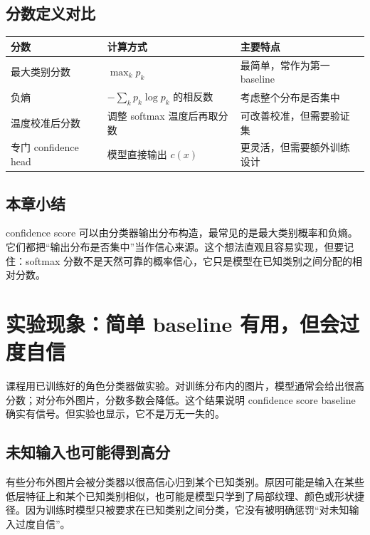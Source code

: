 \documentclass[a4paper]{article}
\begin{document}
\subsection{分数定义对比}

\begin{center}
\begin{tabular}{L{3.0cm} L{4.4cm} L{5.0cm}}
\toprule
分数 & 计算方式 & 主要特点 \\
\midrule
最大类别分数 & $\max_k p_k$ & 最简单，常作为第一 baseline \\
负熵 & $-\sum_k p_k\log p_k$ 的相反数 & 考虑整个分布是否集中 \\
温度校准后分数 & 调整 softmax 温度后再取分数 & 可改善校准，但需要验证集 \\
专门 confidence head & 模型直接输出 $c(x)$ & 更灵活，但需要额外训练设计 \\
\bottomrule
\end{tabular}
\end{center}

\subsection{本章小结}

confidence score 可以由分类器输出分布构造，最常见的是最大类别概率和负熵。它们都把“输出分布是否集中”当作信心来源。这个想法直观且容易实现，但要记住：softmax 分数不是天然可靠的概率信心，它只是模型在已知类别之间分配的相对分数。

\section{实验现象：简单 baseline 有用，但会过度自信}

课程用已训练好的角色分类器做实验。对训练分布内的图片，模型通常会给出很高分数；对分布外图片，分数多数会降低。这个结果说明 confidence score baseline 确实有信号。但实验也显示，它不是万无一失的。

\subsection{未知输入也可能得到高分}

有些分布外图片会被分类器以很高信心归到某个已知类别。原因可能是输入在某些低层特征上和某个已知类别相似，也可能是模型只学到了局部纹理、颜色或形状捷径。因为训练时模型只被要求在已知类别之间分类，它没有被明确惩罚“对未知输入过度自信”。
\end{document}
